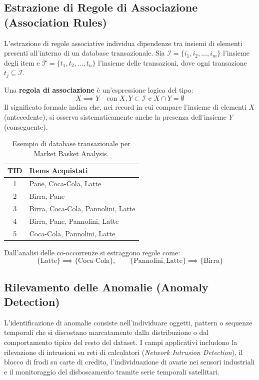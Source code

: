 \subsection{Estrazione di Regole di Associazione (Association Rules)}
L'estrazione di regole associative individua dipendenze tra insiemi di elementi presenti all'interno di un database transazionale. Sia $\mathcal{I} = \{i_1, i_2, \dots, i_m\}$ l'insieme degli item e $\mathcal{T} = \{t_1, t_2, \dots, t_n\}$ l'insieme delle transazioni, dove ogni transazione $t_j \subseteq \mathcal{I}$.

Una \textbf{regola di associazione} \`e un'espressione logica del tipo:
\begin{equation}
    X \implies Y \quad \text{con } X, Y \subset \mathcal{I} \text{ e } X \cap Y = \emptyset
\end{equation}
Il significato formale indica che, nei record in cui compare l'insieme di elementi $X$ (antecedente), si osserva sistematicamente anche la presenza dell'insieme $Y$ (conseguente).

\begin{table}[H]
\centering
\small
\begin{tabular}{c l}
\toprule
\textbf{TID} & \textbf{Items Acquistati} \\
\midrule
1 & Pane, Coca-Cola, Latte \\
2 & Birra, Pane \\
3 & Birra, Coca-Cola, Pannolini, Latte \\
4 & Birra, Pane, Pannolini, Latte \\
5 & Coca-Cola, Pannolini, Latte \\
\bottomrule
\end{tabular}
\caption{Esempio di database transazionale per Market Basket Analysis.}
\label{tab:market-basket}
\end{table}

Dall'analisi delle co-occorrenze si estraggono regole come:
\begin{equation}
    \{\text{Latte}\} \implies \{\text{Coca-Cola}\}, \qquad \{\text{Pannolini}, \text{Latte}\} \implies \{\text{Birra}\}
\end{equation}

\subsection{Rilevamento delle Anomalie (Anomaly Detection)}
L'identificazione di anomalie consiste nell'individuare oggetti, pattern o sequenze temporali che si discostano marcatamente dalla distribuzione o dal comportamento tipico del resto del dataset. I campi applicativi includono la rilevazione di intrusioni su reti di calcolatori (\textit{Network Intrusion Detection}), il blocco di frodi su carte di credito, l'individuazione di avarie nei sensori industriali e il monitoraggio del disboscamento tramite serie temporali satellitari.

